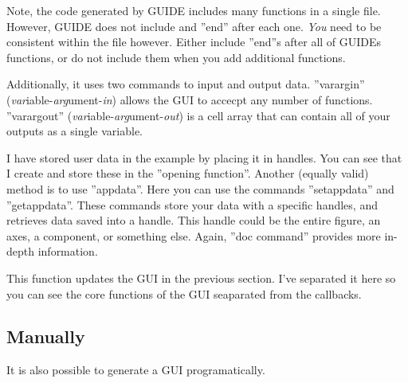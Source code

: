 Note, the code generated by GUIDE includes many functions in a single file.
 However, GUIDE does not include and ''end'' after each one.
 \emph{You} need to be consistent within the file however.
 Either include ''end''s after all of GUIDEs functions, or do not include them when you add additional functions.

Additionally, it uses two commands to input and output data.
 ''varargin'' (\emph{var}iable-\emph{arg}ument-\emph{in}) allows the GUI to accecpt any number of functions.
 ''varargout'' (\emph{var}iable-\emph{arg}ument-\emph{out}) is a cell array that can contain all of your outputs as a single variable.

I have stored user data in the example by placing it in handles.
 You can see that I create and store these in the ''opening function''.
 Another (equally valid) method is to use ''appdata''.
 Here you can use the commands ''setappdata'' and ''getappdata''.
 These commands store your data with a specific handles, and retrieves data saved into a handle.
 This handle could be the entire figure, an axes, a component, or something else.
 Again, ''doc command'' provides more in-depth information.

\begin{quote}

\end{quote}

\pagebreak
This function updates the GUI in the previous section.
 I've separated it here so you can see the core functions of the GUI seaparated from the callbacks.

\begin{quote}

\end{quote}

\pagebreak
\subsection{Manually}
It is also possible to generate a GUI programatically.

\begin{quote}
 
\end{quote}

